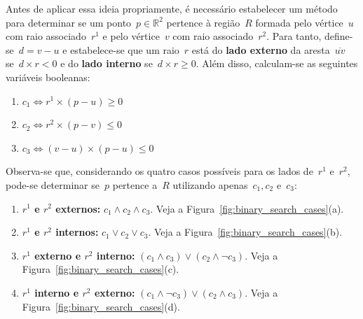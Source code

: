 \documentclass[11pt]{article}
\begin{document}
Antes de aplicar essa ideia propriamente, é necessário estabelecer um método para determinar se um ponto~\(p \in \mathbb{R}^2\) pertence à região~\(R\) formada pelo vértice~\(u\) com raio associado~\(r^1\) e pelo vértice~\(v\) com raio associado~\(r^2\). Para tanto, define-se~\(d = v - u\) e estabelece-se que um raio~\(r\) está do \textbf{lado externo} da aresta~\(\overline{uv}\) se~\(d \times r < 0\) e do \textbf{lado interno} se~\(d \times r \ge 0\). Além disso, calculam-se as seguintes variáveis booleanas:

\begin{enumerate}
	\item \(c_1 \iff r^1 \times (p - u) \ge 0\)
	\item \(c_2 \iff r^2 \times (p - v) \le 0\)
	\item \(c_3 \iff (v - u) \times (p - u) \le 0\)
\end{enumerate}

Observa-se que, considerando os quatro casos possíveis para os lados de~\(r^1\) e~\(r^2\), pode-se determinar se~\(p\) pertence a~\(R\) utilizando apenas~\(c_1, c_2\) e~\(c_3\):

\begin{enumerate}[label=(\alph*)]
	\item \textbf{\(r^1\) e \(r^2\) externos:} \(c_1 \land c_2 \land c_3\). Veja a Figura~\ref{fig:binary_search_cases}(a).
	\item \textbf{\(r^1\) e \(r^2\) internos:} \(c_1 \lor c_2 \lor c_3\). Veja a Figura~\ref{fig:binary_search_cases}(b).
	\item \textbf{\(r^1\) externo e \(r^2\) interno:} \((c_1 \land c_3) \lor (c_2 \land \lnot c_3)\). Veja a Figura~\ref{fig:binary_search_cases}(c).	
	\item \textbf{\(r^1\) interno e \(r^2\) externo:} \((c_1 \land \lnot c_3) \lor (c_2 \land c_3)\). Veja a Figura~\ref{fig:binary_search_cases}(d).
\end{enumerate}
\end{document}
